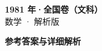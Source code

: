 \documentclass[zihao=-4, a4paper]{ctexart}
\begin{document}
\begin{center}
  {\Large\bfseries 1981 年·全国卷（文科）}\\[4pt]
  {\large 数学 · 解析版}
\end{center}
\medskip
{}

\clearpage
{}
\begin{center}{\Large\bfseries 参考答案与详细解析}\end{center}
\medskip

\end{document}
